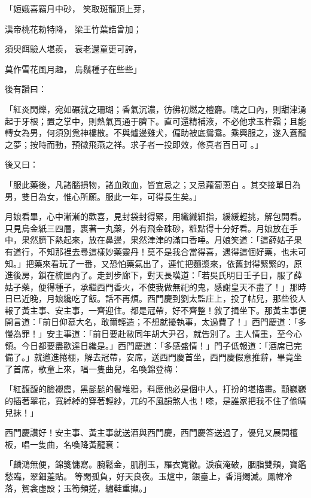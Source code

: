 \begin{showcontents}{}
「姮娥喜竊月中砂，  笑取斑龍頂上芽，

漢帝桃花勅特降，  梁王竹葉誥曾加；

須臾餌驗人堪羨，  衰老還童更可誇，

莫作雪花風月趣，  烏鬚種子在些些」

後有讚曰：

「紅炎閃爍，宛如碾就之珊瑚；香氣沉濃，彷彿初燃之檀麝。噙之口內，則甜津湧起于牙根；置之掌中，則熱氣貫通于臍下。直可還精補液，不必他求玉杵霜；且能轉女為男，何須別覓神樓散。不與爐邊雞犬，偏助被底鴛鴦。乘興服之，遂入蒼龍之夢；按時而動，預徵飛燕之祥。求子者一投即效，修真者百日可 。」

後又曰：

「服此藥後，凡諸腦損物，諸血敗血，皆宜忌之；又忌蘿蔔蔥白 。其交接單日為男，雙日為女，惟心所願。服此一年，可得長生矣。」

月娘看畢，心中漸漸的歡喜，見封袋封得緊，用纖纖細指，緩緩輕挑，解包開看。只見烏金紙三四層，裹著一丸藥，外有飛金硃砂，粧點得十分好看。月娘放在手中，果然臍下熱起來，放在鼻邊，果然津津的滿口香唾。月娘笑道：「這薛姑子果有道行，不知那裡去尋這樣妙藥靈丹！莫不是我合當得喜，遇得這個好藥，也未可知。」把藥來看玩了一番，又恐怕藥氣出了，連忙把麵漿來，依舊封得緊緊的，原進後房，鎖在梳匣內了。走到步廊下，對天長嘆道：「若吳氏明日壬子日，服了薛姑子藥，便得種子，承繼西門香火，不使我做無祀的鬼，感謝皇天不盡了！」那時日已近晚，月娘纔吃了飯。話不再煩。西門慶到劉太監庄上，投了帖兒，那些役人報了黃主事、安主事，一齊迎住。都是冠帶，好不齊整！敘了揖坐下。那黃主事便開言道：「前日仰慕大名，敢爾輕造；不想就擾執事，太過費了！」西門慶道：「多慢為罪！」安主事道：「前日要赴敝同年胡大尹召，就告別了。主人情重，至今心領。今日都要盡歡達日纔是。」西門慶道：「多感盛情！」門子低報道：「酒席已完備了。」就邀進捲棚，解去冠帶，安席，送西門慶首坐，西門慶假意推辭，畢竟坐了首席，歌童上來，唱一隻曲兒，名喚錦登梅：

「紅馥馥的臉襯霞，黑髭髭的鬢堆鴉，料應他必是個中人，打扮的堪描畫。顫巍巍的插著翠花，寬綽綽的穿著輕紗，兀的不風韻煞人也！嗏，是誰家把我不住了偷晴兒抹！」

西門慶讚好！安主事、黃主事就送酒與西門慶，西門慶答送過了，優兒又展開檀板，唱一隻曲，名喚降黃龍袬：

「麟鴻無便，錦箋慵寫。腕鬆金，肌削玉，羅衣寬徹。淚痕淹破，胭脂雙頰，寶鑑愁臨，翠鈿羞貼。 等閑孤負，好天良夜。玉爐中，銀臺上，香消燭滅。鳳幃冷落，鴛衾虛設；玉筍頻搓，繡鞋重攧。」


\end{showcontents}

